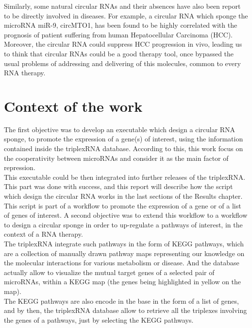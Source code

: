 \documentclass[a4paper,12pt]{report}
\begin{document}
Similarly, some natural circular RNAs and their absences have also been report to be directly involved in diseases. For example, a circular RNA which sponge the microRNA miR-9, circMTO1, has been found to be highly  correlated with the prognosis of patient suffering from human Hepatocellular Carcinoma (HCC)\cite{carcinoma}.\\

Moreover, the circular RNA could suppress HCC progression in vivo\cite{carcinoma}, leading us to think that circular RNAs could be a good therapy tool, once bypassed the usual problems of addressing and delivering of this molecules, common to every RNA therapy\cite{therapeutics}.

\section{Context of the work}

The first objective was to develop an executable which design a circular RNA sponge, to promote the expression of a gene(s) of interest, using the information contained inside the triplexRNA database. According to this, this work focus on the cooperativity between microRNAs and consider it as the main factor of repression.\\ 

This executable could be then integrated into further releases of the triplexRNA. This part was done with success, and this report will describe how the script which design the circular RNA works in the last sections of the Results chapter.\\

This script is part of a workflow to promote the expression of a gene or of a list of genes of interest. A second objective was to extend this workflow to a workflow to design a circular sponge in order to up-regulate a pathways of interest, in the context of a RNA therapy.\\

The triplexRNA integrate such pathways in the form of KEGG pathways, which are a collection of manually drawn pathway maps representing our knowledge on the molecular interactions for various metabolism or disease\cite{KEGG, triplex}. And the database actually allow to visualize the mutual target genes of a selected pair of microRNAs, within a KEGG map (the genes being highlighted in yellow on the map).\\

The KEGG pathways are also encode in the base in the form of a list of genes, and by then, the triplexRNA database allow to retrieve all the triplexes involving the genes of a pathways, just by selecting the KEGG pathways\cite{triplex}.\\
\end{document}

